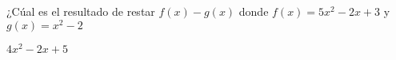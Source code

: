 
\question ¿Cúal es el resultado de restar $f(x) - g(x)$ donde
          $f(x) = 5x^2 - 2x + 3$ y $g(x) = x^2 -2$

  \begin{solution}[1cm]
    $4x^2 - 2x + 5$
  \end{solution}
